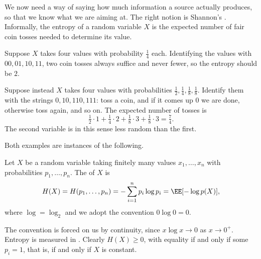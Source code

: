 We now need a way of saying how much information a source actually produces, so that we know what we are aiming at. The right notion is Shannon's . Informally, the entropy of a random variable $X$ is the expected number of fair coin tosses needed to determine its value.

\begin{example}
	Suppose $X$ takes four values with probability $\tfrac14$ each. Identifying the values with $00, 01, 10, 11$, two coin tosses always suffice and never fewer, so the entropy should be $2$.

	Suppose instead $X$ takes four values with probabilities $\tfrac12, \tfrac14, \tfrac18, \tfrac18$. Identify them with the strings $0, 10, 110, 111$: toss a coin, and if it comes up $0$ we are done, otherwise toss again, and so on. The expected number of tosses is
	$$\tfrac12 \cdot 1 + \tfrac14 \cdot 2 + \tfrac18 \cdot 3 + \tfrac18 \cdot 3 = \tfrac74.$$
	The second variable is in this sense less random than the first.
\end{example}

Both examples are instances of the following.

\begin{definition}[Entropy]
	Let $X$ be a random variable taking finitely many values $x_1, \dots, x_n$ with probabilities $p_1, \dots, p_n$. The  of $X$ is
	$$H(X) = H(p_1, \dots, p_n) = -\sum_{i=1}^n p_i \log p_i = \EE[-\log p(X)],$$
	where $\log = \log_2$ and we adopt the convention $0\log 0 = 0$.
\end{definition}

The convention is forced on us by continuity, since $x \log x \to 0$ as $x \to 0^+$. Entropy is measured in . Clearly $H(X) \ge 0$, with equality if and only if some $p_i = 1$, that is, if and only if $X$ is constant.

